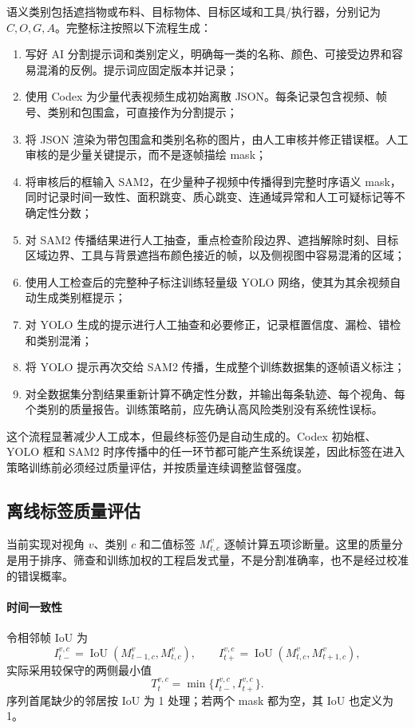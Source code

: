 \documentclass[UTF8,a4paper,11pt]{ctexart}
\begin{document}
语义类别包括遮挡物或布料、目标物体、目标区域和工具/执行器，分别记为 $C,O,G,A$。完整标注按照以下流程生成：
\begin{enumerate}[leftmargin=2.3em]
  \item 写好 AI 分割提示词和类别定义，明确每一类的名称、颜色、可接受边界和容易混淆的反例。提示词应固定版本并记录；
  \item 使用 Codex 为少量代表视频生成初始离散 JSON。每条记录包含视频、帧号、类别和包围盒，可直接作为分割提示；
  \item 将 JSON 渲染为带包围盒和类别名称的图片，由人工审核并修正错误框。人工审核的是少量关键提示，而不是逐帧描绘 mask；
  \item 将审核后的框输入 SAM2，在少量种子视频中传播得到完整时序语义 mask\cite{ravi2024sam2}，同时记录时间一致性、面积跳变、质心跳变、连通域异常和人工可疑标记等不确定性分数；
  \item 对 SAM2 传播结果进行人工抽查，重点检查阶段边界、遮挡解除时刻、目标区域边界、工具与背景遮挡布颜色接近的帧，以及侧视图中容易混淆的区域；
  \item 使用人工检查后的完整种子标注训练轻量级 YOLO 网络\cite{redmon2016yolo}，使其为其余视频自动生成类别框提示；
  \item 对 YOLO 生成的提示进行人工抽查和必要修正，记录框置信度、漏检、错检和类别混淆；
  \item 将 YOLO 提示再次交给 SAM2 传播，生成整个训练数据集的逐帧语义标注；
  \item 对全数据集分割结果重新计算不确定性分数，并输出每条轨迹、每个视角、每个类别的质量报告。训练策略前，应先确认高风险类别没有系统性误标。
\end{enumerate}

这个流程显著减少人工成本，但最终标签仍是自动生成的。Codex 初始框、YOLO 框和 SAM2 时序传播中的任一环节都可能产生系统误差，因此标签在进入策略训练前必须经过质量评估，并按质量连续调整监督强度。

\subsection{离线标签质量评估}

当前实现对视角 $v$、类别 $c$ 和二值标签 $M_{t,c}^{v}$ 逐帧计算五项诊断量。这里的质量分是用于排序、筛查和训练加权的工程启发式量，不是分割准确率，也不是经过校准的错误概率。

\paragraph{时间一致性}
令相邻帧 IoU 为
\begin{equation}
I_{t-}^{v,c}=\operatorname{IoU}(M_{t-1,c}^{v},M_{t,c}^{v}),\qquad
I_{t+}^{v,c}=\operatorname{IoU}(M_{t,c}^{v},M_{t+1,c}^{v}),
\end{equation}
实际采用较保守的两侧最小值
\begin{equation}
T_t^{v,c}=\min\{I_{t-}^{v,c},I_{t+}^{v,c}\}.
\end{equation}
序列首尾缺少的邻居按 IoU 为 1 处理；若两个 mask 都为空，其 IoU 也定义为 1。
\end{document}
